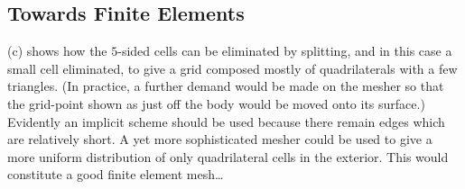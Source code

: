 \subsection{Towards Finite Elements}\label{sec:elements}
(c) shows how the $5$-sided cells can be eliminated by splitting, and in
this case a small cell eliminated, to give a grid composed mostly of quadrilaterals with 
a few triangles.
(In practice, a further demand would be made on the mesher so that the grid-point
shown as just off the body would be moved onto its surface.) Evidently an implicit scheme
should be used because there remain edges which are relatively short. A yet more
sophisticated mesher could be used to give a more uniform distribution of only
quadrilateral cells in the exterior. This would constitute a good finite element mesh\ldots
